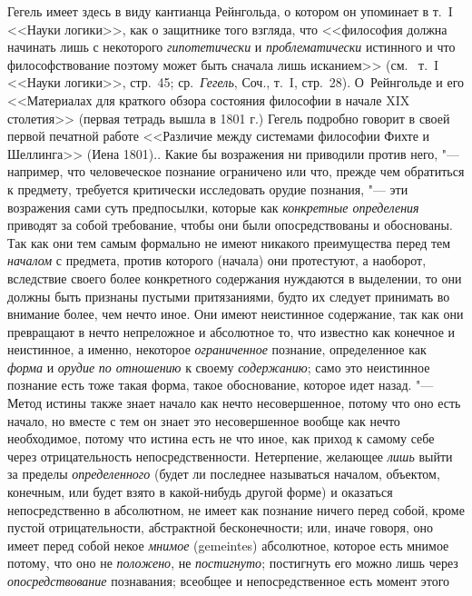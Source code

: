 {{{Гегель имеет здесь в виду кантианца
Рейнгольда, о котором он упоминает в т.~I <<Науки логики>>, как о защитнике
того взгляда, что <<философия должна начинать лишь с некоторого
{\em гипотетически} и {\em проблематически}
истинного и что философствование поэтому может быть сначала
лишь исканием>> (см. \ т.~I <<Науки логики>>, стр.~45; ср.~{\em Гегель},
Соч., т.~I, стр.~28). О~Рейнгольде и его <<Материалах для
краткого обзора состояния философии в начале XIX столетия>> (первая тетрадь
вышла в 1801 г.) Гегель подробно говорит в своей первой печатной работе
<<Различие между системами философии Фихте и Шеллинга>> (Иена 1801).\label{bkm:bm129}}.
Какие бы возражения ни приводили против него, "---
например, что человеческое познание ограничено или что,
прежде чем обратиться к предмету, требуется критически исследовать орудие
познания,
"--- эти возражения сами суть предпосылки, которые как
{\em конкретные определения}
приводят за собой требование, чтобы они были опосредствованы
и обоснованы. Так как они тем самым формально не имеют никакого
преимущества перед тем {\em началом}
с предмета, против которого (начала) они протестуют, а
наоборот, вследствие своего более конкретного содержания нуждаются в
выделении, то они должны быть признаны пустыми притязаниями, будто их
следует принимать во внимание более, чем нечто иное. Они имеют
неистинное содержание, так как они превращают в нечто непреложное и
абсолютное то, что известно как конечное и неистинное, а именно, некоторое
{\em ограниченное} познание, определенное как {\em форма} и {\em орудие}
{\em по отношению} к своему {\em содержанию};
само это неистинное познание есть тоже такая форма, такое
обоснование, которое идет назад. "--- Метод истины также знает
начало как нечто несовершенное, потому что оно есть начало, но вместе с тем
он знает это несовершенное вообще как нечто необходимое,
потому что истина есть не что иное, как приход к самому себе через
отрицательность непосредственности. Нетерпение, желающее
{\em лишь} выйти за пределы {\em определенного}
(будет ли последнее называться началом, объектом, конечным,
или будет взято в какой-нибудь другой форме) и оказаться непосредственно в
абсолютном, не имеет как познание ничего перед собой, кроме пустой
отрицательности, абстрактной бесконечности; или, иначе говоря, оно имеет
перед собой некое {\em мнимое} (gemeintes) абсолютное, которое есть мнимое
потому, что оно не {\em положено}, не {\em постигнуто};
постигнуть его можно лишь через {\em опосредствование}
познавания; всеобщее и непосредственное есть момент этого
}}
